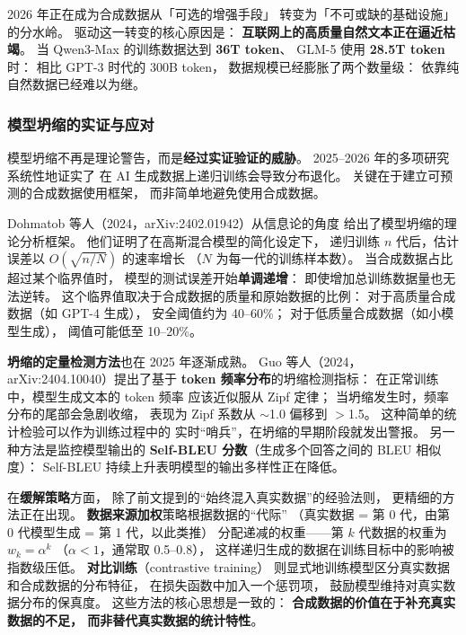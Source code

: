 2026 年正在成为合成数据从「可选的增强手段」
转变为「不可或缺的基础设施」的分水岭。
驱动这一转变的核心原因是：
\textbf{互联网上的高质量自然文本正在逼近枯竭}。
当 Qwen3-Max 的训练数据达到 \textbf{36T token}、
GLM-5 使用 \textbf{28.5T token} 时：
相比 GPT-3 时代的 300B token，
数据规模已经膨胀了两个数量级：
依靠纯自然数据已经难以为继。

\subsubsection{模型坍缩的实证与应对}

模型坍缩不再是理论警告，而是\textbf{经过实证验证的威胁}。
2025--2026 年的多项研究系统性地证实了
在 AI 生成数据上递归训练会导致分布退化。
关键在于建立可预测的合成数据使用框架，
而非简单地避免使用合成数据。

Dohmatob 等人（2024，arXiv:2402.01942）从信息论的角度
给出了模型坍缩的理论分析框架。
他们证明了在高斯混合模型的简化设定下，
递归训练 $n$ 代后，估计误差以
$O(\sqrt{n / N})$ 的速率增长
（$N$ 为每一代的训练样本数）。
当合成数据占比超过某个临界值时，
模型的测试误差开始\textbf{单调递增}：
即使增加总训练数据量也无法逆转。
这个临界值取决于合成数据的质量和原始数据的比例：
对于高质量合成数据（如 GPT-4 生成），
安全阈值约为 40--60\%；
对于低质量合成数据（如小模型生成），
阈值可能低至 10--20\%。

\textbf{坍缩的定量检测方法}也在 2025 年逐渐成熟。
Guo 等人（2024，arXiv:2404.10040）提出了基于
\textbf{token 频率分布}的坍缩检测指标：
在正常训练中，模型生成文本的 token 频率
应该近似服从 Zipf 定律；
当坍缩发生时，频率分布的尾部会急剧收缩，
表现为 Zipf 系数从 $\sim$1.0 偏移到 $>$1.5。
这种简单的统计检验可以作为训练过程中的
实时“哨兵”，在坍缩的早期阶段就发出警报。
另一种方法是监控模型输出的
\textbf{Self-BLEU 分数}（生成多个回答之间的 BLEU 相似度）：
Self-BLEU 持续上升表明模型的输出多样性正在降低。

在\textbf{缓解策略}方面，
除了前文提到的“始终混入真实数据”的经验法则，
更精细的方法正在出现。
\textbf{数据来源加权}策略根据数据的“代际”
（真实数据 = 第 0 代，由第 0 代模型生成 = 第 1 代，以此类推）
分配递减的权重——第 $k$ 代数据的权重为 $w_k = \alpha^k$
（$\alpha < 1$，通常取 0.5--0.8），
这样递归生成的数据在训练目标中的影响被指数级压低。
\textbf{对比训练}（contrastive training）
则显式地训练模型区分真实数据和合成数据的分布特征，
在损失函数中加入一个惩罚项，
鼓励模型维持对真实数据分布的保真度。
这些方法的核心思想是一致的：
\textbf{合成数据的价值在于补充真实数据的不足，
而非替代真实数据的统计特性}。

